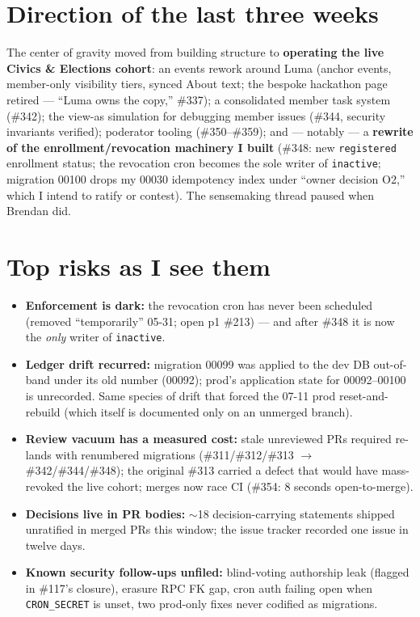 \documentclass[10pt]{article}
\newcommand{\gh}[1]{\mbox{\##1}}
\begin{document}
\section{Direction of the last three weeks}
The center of gravity moved from building structure to \textbf{operating the live Civics \& Elections cohort}: an events rework around Luma (anchor events, member-only visibility tiers, synced About text; the bespoke hackathon page retired --- ``Luma owns the copy,'' \gh{337}); a consolidated member task system (\gh{342}); the view-as simulation for debugging member issues (\gh{344}, security invariants verified); poderator tooling (\gh{350}--\gh{359}); and --- notably --- a \textbf{rewrite of the enrollment/revocation machinery I built} (\gh{348}: new \texttt{registered} enrollment status; the revocation cron becomes the sole writer of \texttt{inactive}; migration 00100 drops my 00030 idempotency index under ``owner decision O2,'' which I intend to ratify or contest). The sensemaking thread paused when Brendan did.

\section{Top risks as I see them}
\begin{itemize}
  \item \textbf{Enforcement is dark:} the revocation cron has never been scheduled (removed ``temporarily'' 05-31; open p1 \gh{213}) --- and after \gh{348} it is now the \emph{only} writer of \texttt{inactive}.
  \item \textbf{Ledger drift recurred:} migration 00099 was applied to the dev DB out-of-band under its old number (00092); prod's application state for 00092--00100 is unrecorded. Same species of drift that forced the 07-11 prod reset-and-rebuild (which itself is documented only on an unmerged branch).
  \item \textbf{Review vacuum has a measured cost:} stale unreviewed PRs required re-lands with renumbered migrations (\gh{311}/\gh{312}/\gh{313} $\rightarrow$ \gh{342}/\gh{344}/\gh{348}); the original \gh{313} carried a defect that would have mass-revoked the live cohort; merges now race CI (\gh{354}: 8 seconds open-to-merge).
  \item \textbf{Decisions live in PR bodies:} $\sim$18 decision-carrying statements shipped unratified in merged PRs this window; the issue tracker recorded one issue in twelve days.
  \item \textbf{Known security follow-ups unfiled:} blind-voting authorship leak (flagged in \gh{117}'s closure), erasure RPC FK gap, cron auth failing open when \texttt{CRON\_SECRET} is unset, two prod-only fixes never codified as migrations.
\end{itemize}
\end{document}
